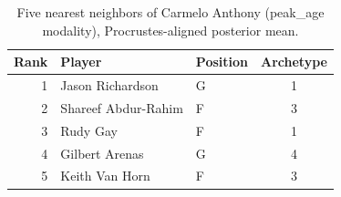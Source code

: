 \begin{table}[htbp]
  \centering\small
  \begin{tabular}{rllc}
    \toprule
    Rank & Player & Position & Archetype \\
    \midrule
    1 & Jason Richardson & G & 1 \\
    2 & Shareef Abdur-Rahim & F & 3 \\
    3 & Rudy Gay & F & 1 \\
    4 & Gilbert Arenas & G & 4 \\
    5 & Keith Van Horn & F & 3 \\
    \bottomrule
  \end{tabular}
  \caption{Five nearest neighbors of Carmelo Anthony (peak_age modality), Procrustes-aligned posterior mean.}
  \label{tab:Carmelo_Anthony_neighbors_peak_age}
\end{table}


